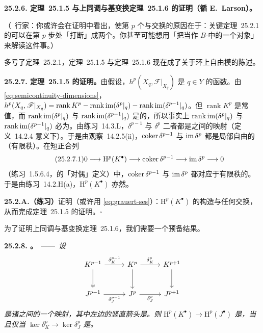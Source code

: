 \textbf{25.2.6. \mbox{\trGrauert{}定理~25.1.5} 与\mbox{上同调与基变换定理~25.1.6} 的证明（循 E.~Larson）。}

（\extrahard\ 行家：你或许会在证明中看出，使第 $p$ 个\trCohomology{}与\trBaseChange{}交换的原因在于：\mbox{关键定理~25.2.1} 的\trComplexN{}可以在第 $p$ 步处「打断」成两个\trComplexN。你甚至可能想用「把\trCech\trComplexN{}当作 $B$-\trModule{}\trDerivedCategory{}中的一个对象」来解读这件事。）

多亏了\mbox{定理~25.2.1}，\mbox{定理~25.1.5} 与\mbox{定理~25.1.6} 现在成了关于\trNoether{}环上自由模\trComplexN{}的陈述。

\textbf{25.2.7. \mbox{\trGrauert{}定理~25.1.5} 的证明。}\quad 由假设，$h^p(X_q,\mathscr{F}|_{X_q})$ 是 $q\in Y$ 的\trLocallyConstant{}函数。由 \eqref{eq:semicontinuity-dimensions}，$h^p(X_q,\mathscr{F}|_{X_q})=\operatorname{rank}K^p-\operatorname{rank}\operatorname{im}(\delta^p|_q)-\operatorname{rank}\operatorname{im}(\delta^{p-1}|_q)$。但 $\operatorname{rank}K^p$ 是常值，而 $\operatorname{rank}\operatorname{im}(\delta^p|_q)$ 与 $\operatorname{rank}\operatorname{im}(\delta^{p-1}|_q)$ 是\trLowerSemicontinuous{}的，所以事实上 $\operatorname{rank}\operatorname{im}(\delta^p|_q)$ 与 $\operatorname{rank}\operatorname{im}(\delta^{p-1}|_q)$ 必为\trLocallyConstant。由\mbox{练习~14.3.L}，$\delta^{p-1}$ 与 $\delta^p$ 二者都是\trVectorBundle{}之间的映射（\mbox{定义~14.2.4} 意义下）。于是由\mbox{观察~14.2.5}(ii)，$\operatorname{coker}\delta^{p-1}$ 与 $\operatorname{im}\delta^p$ 都是局部自由的（有限秩）。在短正合列
\begin{equation*}
\tag{25.2.7.1}\label{eq:grauert-ses}
0\longrightarrow \mathrm{H}^p(K^{\bullet})\longrightarrow \operatorname{coker}\delta^{p-1}\longrightarrow \operatorname{im}\delta^p\longrightarrow 0
\end{equation*}
（\mbox{练习~1.5.6.4}，\trCohomology{}的「对偶」定义）中，$\operatorname{coker}\delta^{p-1}$ 与 $\operatorname{im}\delta^p$ 都对应于有限秩的\trLocallyFreeSheaf。于是由\mbox{练习~14.2.H}(a)，$\mathrm{H}^p(K^{\bullet})$ 亦然。

\textbf{25.2.A.（练习）}\quad 证明（或许用 \eqref{eq:grauert-ses}）：$\mathrm{H}^p(K^{\bullet})$ 的构造与任何\trBaseChange{}交换，从而完成\mbox{\trGrauert{}定理~25.1.5} 的证明。\hfill$\square$

为了证明\mbox{上同调与基变换定理~25.1.6}，我们需要一个预备结果。

\textbf{25.2.8. \trhLemma。}\ ——\ \emph{设}
\[
\begin{tikzcd}[row sep=2.6em, column sep=2.8em]
K^{p-1} \ar[r, "\delta^{p-1}_K"] \ar[d, two heads] & K^{p} \ar[r, "\delta^{p}_K"] \ar[d] & K^{p+1} \ar[d] \\
J^{p-1} \ar[r, "\delta^{p-1}_J"'] & J^{p} \ar[r, "\delta^{p}_J"'] & J^{p+1}
\end{tikzcd}
\]
\emph{是诸\trComplexN{}之间的一个映射，其中左边的竖直箭头是\trEpimorphism。则 $\mathrm{H}^p(K^{\bullet})\to\mathrm{H}^p(J^{\bullet})$ 是\trSurjectiveMap，当且仅当 $\ker\delta^p_K\to\ker\delta^p_J$ 是\trSurjectiveMap。}

